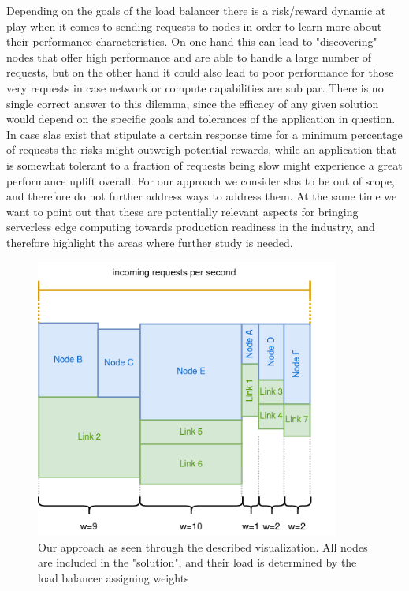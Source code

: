 Depending on the goals of the load balancer there is a risk/reward dynamic at play when it comes to sending requests to nodes in order to learn more about their performance characteristics. On one hand this can lead to "discovering" nodes that offer high performance and are able to handle a large number of requests, but on the other hand it could also lead to poor performance for those very requests in case network or compute capabilities are sub par.
There is no single correct answer to this dilemma, since the efficacy of any given solution would depend on the specific goals and tolerances of the application in question. In case \glspl{sla} exist that stipulate a certain response time for a minimum percentage of requests the risks might outweigh potential rewards, while an application that is somewhat tolerant to a fraction of requests being slow might experience a great performance uplift overall.
For our approach we consider \glspl{sla} to be out of scope, and therefore do not further address ways to address them. At the same time we want to point out that these are potentially relevant aspects for bringing serverless edge computing towards production readiness in the industry, and therefore highlight the areas where further study is needed.

\begin{figure}
    \centering
    \includegraphics[width=10cm]{graphics/diagrams/lb_weights.png}
    \caption{Our approach as seen through the described visualization. All nodes are included in the "solution", and their load is determined by the load balancer assigning weights}
    \label{fig:lb_weights}
\end{figure}

